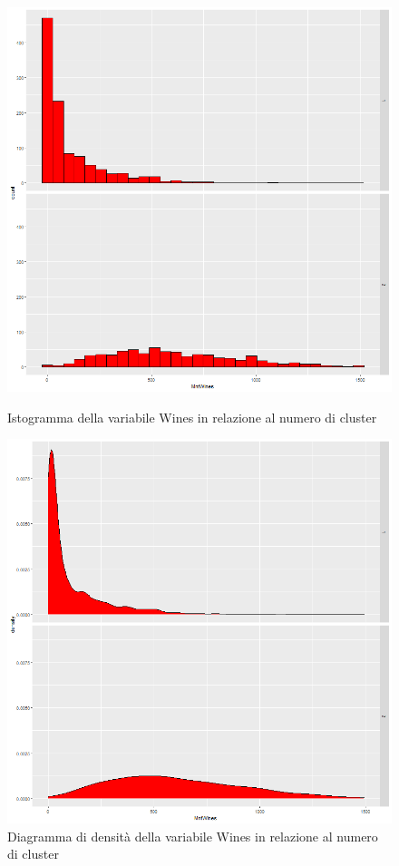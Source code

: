 \documentclass[letterpaper,11pt]{article}
\begin{document}
\begin{figure}[!htb]
   \begin{minipage}{0.48\textwidth}
     \centering
         \includegraphics[width=1\textwidth]{Img/K-MEANS/KMEANS007.png}
    \caption{Istogramma della variabile Wines in relazione al numero di cluster}
    \label{fig:winesKmeansHistogram}
   \end{minipage}\hfill
   \begin{minipage}{0.48\textwidth}
     \centering
     \includegraphics[width=1\linewidth]{Img/K-MEANS/KMEANS008.png}
     \caption{Diagramma di densità della variabile Wines in relazione al numero di cluster}\label{fig:winesKmeansDensity}
   \end{minipage}
\end{figure}
\end{document}
